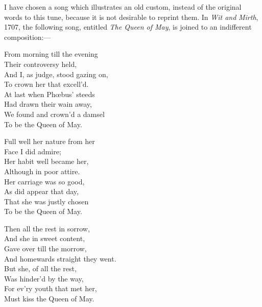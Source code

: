 I have chosen a song which illustrates an old custom, instead of the original
words to this tune, because it is not \pagebreak desirable to reprint them. In \textit{Wit and}
\textit{Mirth}, 1707, the following song, entitled \textit{The Queen of May}, is joined to an
indifferent composition:—




\settowidth{\versewidth}{And homewards straight they went.}
\begin{dcverse}\begin{altverse}
From morning till the evening\\
Their controversy held,\\
And I, as judge, stood gazing on,\\
To crown her that excell’d.\\
At last when Phœbus’ steeds\\
Had drawn their wain away,\\
We found and crown’d a damsel\\
To be the Queen of May.
\end{altverse}

\begin{altverse}
Full well her nature from her\\
Face I did admire;\\
Her habit well became her,\\
Although in poor attire.\\
Her carriage was so good,\\
As did appear that day,\\
That she was justly chosen\\
To be the Queen of May.
\end{altverse}

\begin{altverse}
Then all the rest in sorrow,\\
And she in sweet content,\\
Gave over till the morrow,\\
And homewards straight they went.\\
But she, of all the rest,\\
Was hinder’d by the way,\\
For ev’ry youth that met her,\\
Must kiss the Queen of May.
\end{altverse}
\end{dcverse}


